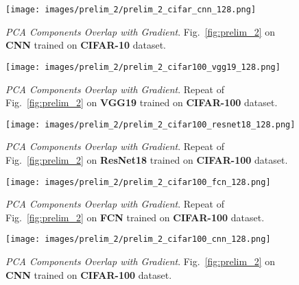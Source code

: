 \begin{figure}[h!]
  \centering
  \centerline{\texttt{[image: images/prelim\_2/prelim\_2\_cifar\_cnn\_128.png]}}
  \caption{\small{\textit{PCA Components Overlap with Gradient}. Fig.~\ref{fig:prelim_2} on \textbf{CNN} trained on \textbf{CIFAR-10} dataset.}}
  \label{fig:prelim_2_cifar_cnn}
\end{figure}

\clearpage

\begin{figure}[h!]
  \centering
  \centerline{\texttt{[image: images/prelim\_2/prelim\_2\_cifar100\_vgg19\_128.png]}}
  \caption{\small{\textit{PCA Components Overlap with Gradient}. Repeat of Fig.~\ref{fig:prelim_2} on \textbf{VGG19} trained on \textbf{CIFAR-100} dataset.}}
  \label{fig:prelim_2_cifar100_vgg19}
\end{figure}

\begin{figure}[h!]
  \centering
  \centerline{\texttt{[image: images/prelim\_2/prelim\_2\_cifar100\_resnet18\_128.png]}}
  \caption{\small{\textit{PCA Components Overlap with Gradient}. Repeat of Fig.~\ref{fig:prelim_2} on \textbf{ResNet18} trained on \textbf{CIFAR-100} dataset.}}
  \label{fig:prelim_2_cifar100_resnet18}
\end{figure}
\clearpage
\begin{figure}[h!]
  \centering
  \centerline{\texttt{[image: images/prelim\_2/prelim\_2\_cifar100\_fcn\_128.png]}}
  \caption{\small{\textit{PCA Components Overlap with Gradient}. Repeat of Fig.~\ref{fig:prelim_2} on \textbf{FCN} trained on \textbf{CIFAR-100} dataset.}}
  \label{fig:prelim_2_cifar100_fcn}
\end{figure}

\begin{figure}[h!]
  \centering
  \centerline{\texttt{[image: images/prelim\_2/prelim\_2\_cifar100\_cnn\_128.png]}}
  \caption{\small{\textit{PCA Components Overlap with Gradient}. Fig.~\ref{fig:prelim_2} on \textbf{CNN} trained on \textbf{CIFAR-100} dataset.}}
  \label{fig:prelim_2_cifar100_cnn}
\end{figure}


\clearpage

